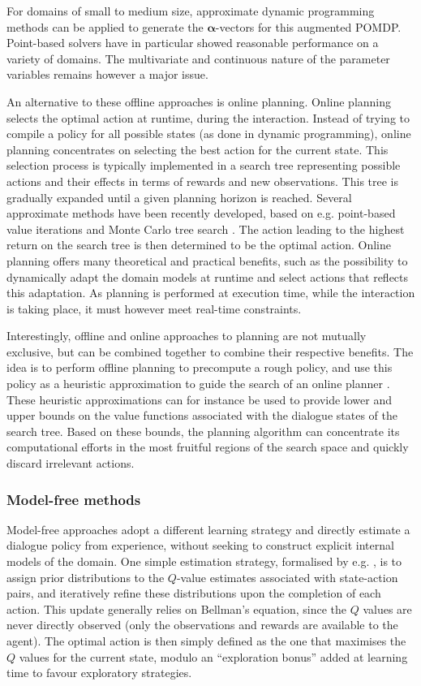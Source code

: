 For domains of small to medium size, approximate dynamic programming methods can be applied to generate the $\boldsymbol\alpha$-vectors for this augmented POMDP.  Point-based solvers \citep{Pineau:2004,Porta:2006} have in particular showed reasonable performance on a variety of domains. The multivariate and continuous nature of the parameter variables remains however a major issue. 

An alternative to these offline approaches is online planning.  Online planning selects the optimal action at runtime, during the interaction. Instead of trying to compile a policy for all possible states (as done in dynamic programming), online planning concentrates on selecting the best action for the current state. This selection process is typically implemented in a search tree representing possible actions and their effects in terms of rewards and new observations. This tree is gradually expanded until a given planning horizon is reached.  Several approximate methods have been recently developed, based on e.g. point-based value iterations \citep{ross2008} and Monte Carlo tree search \citep{silver2010uct}. The action leading to the highest return on the search tree is then determined to be the optimal action. Online planning offers many theoretical and practical benefits, such as the possibility to dynamically adapt the domain models at runtime and select actions that reflects this adaptation. As planning is performed at execution time, while the interaction is taking place, it must however meet real-time constraints. 

Interestingly, offline and online approaches to planning are not mutually exclusive, but can be combined together to combine their respective benefits.  The idea is to perform offline planning to precompute a rough policy, and use this policy as a heuristic approximation to guide the search of an online planner \citep{RossC07}. These heuristic approximations can for instance be used to provide lower and upper bounds on the value functions associated with the dialogue states of the search tree.  Based on these bounds, the planning algorithm can concentrate its computational efforts in the most fruitful regions of the search space and quickly discard irrelevant actions. 

\subsubsection*{Model-free methods}

Model-free approaches adopt a different learning strategy and directly estimate a dialogue policy from experience, without seeking to construct explicit internal models of the domain. One simple estimation strategy, formalised by e.g. \cite{Dearden:1998}, is to assign prior distributions to the $Q$-value estimates associated with state-action pairs, and iteratively refine these distributions upon the completion of each action. This update generally relies on Bellman's equation, since the $Q$ values are never directly observed (only the observations and rewards are available to the agent). The optimal action is then simply defined as the one that maximises the $Q$ values for the current state, modulo an ``exploration bonus'' added at learning time to favour exploratory strategies. 

